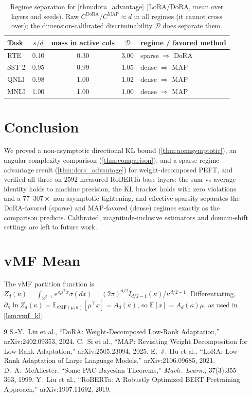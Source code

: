 \documentclass[11pt]{article}
\newcommand{\vMF}{\mathrm{vMF}}
\newcommand{\Ad}{A_d}
\newcommand{\Sd}{\mathbb{S}^{d-1}}
\newcommand{\E}{\mathbb{E}}
\begin{document}
\begin{table}[t]
\centering
\caption{Regime separation for \cref{thm:dora_advantage} (LoRA/DoRA, mean over layers
and seeds). Raw $C^{\mathrm{DoRA}}/C^{\mathrm{MAP}}\!\approx\!d$ in all regimes (it
cannot cross over); the dimension-calibrated discriminability $\mathcal{D}$ does
separate them.}
\label{tab:regime}
\small
\begin{tabular}{lcccl}
\toprule
Task & $s/d$ & mass in active cols & $\mathcal{D}$ & regime / favored method \\
\midrule
RTE   & 0.10 & 0.30 & 3.00 & sparse $\Rightarrow$ DoRA \\
SST-2 & 0.95 & 0.99 & 1.05 & dense $\Rightarrow$ MAP \\
QNLI  & 0.98 & 1.00 & 1.02 & dense $\Rightarrow$ MAP \\
MNLI  & 1.00 & 1.00 & 1.00 & dense $\Rightarrow$ MAP \\
\bottomrule
\end{tabular}
\end{table}

\section{Conclusion}
We proved a non-asymptotic directional KL bound (\cref{thm:nonasymptotic}), an angular
complexity comparison (\cref{thm:comparison}), and a sparse-regime advantage result
(\cref{thm:dora_advantage}) for weight-decomposed PEFT, and verified all three on
$2592$ measured RoBERTa-base layers: the sum-vs-average identity holds to machine
precision, the KL bracket holds with zero violations and a $77$--$307\times$
non-asymptotic tightening, and effective sparsity separates the DoRA-favored (sparse)
and MAP-favored (dense) regimes exactly as the comparison predicts. Calibrated,
magnitude-inclusive estimators and domain-shift settings are left to future work.

\appendix
\section{vMF Mean}\label{app:mean}
The vMF partition function is $Z_d(\kappa)=\int_{\Sd}e^{\kappa\mu^\top x}\sigma(dx)
=(2\pi)^{d/2}I_{d/2-1}(\kappa)/\kappa^{d/2-1}$. Differentiating,
$\partial_\kappa\ln Z_d(\kappa)=\E_{\vMF(\mu,\kappa)}[\mu^\top x]=\Ad(\kappa)$,
so $\E[x]=\Ad(\kappa)\mu$, as used in \cref{lem:vmf_kl}.

\begin{thebibliography}{9}
\small
{} S.-Y.\ Liu et al., ``DoRA: Weight-Decomposed Low-Rank
Adaptation,'' arXiv:2402.09353, 2024.
 C.\ Si et al., ``MAP: Revisiting Weight Decomposition for Low-Rank
Adaptation,'' arXiv:2505.23094, 2025.
 E.\ J.\ Hu et al., ``LoRA: Low-Rank Adaptation of Large Language
Models,'' arXiv:2106.09685, 2021.
 D.\ A.\ McAllester, ``Some PAC-Bayesian Theorems,''
\textit{Mach.\ Learn.}, 37(3):355--363, 1999.
 Y.\ Liu et al., ``RoBERTa: A Robustly Optimized BERT
Pretraining Approach,'' arXiv:1907.11692, 2019.
\end{thebibliography}
\end{document}
